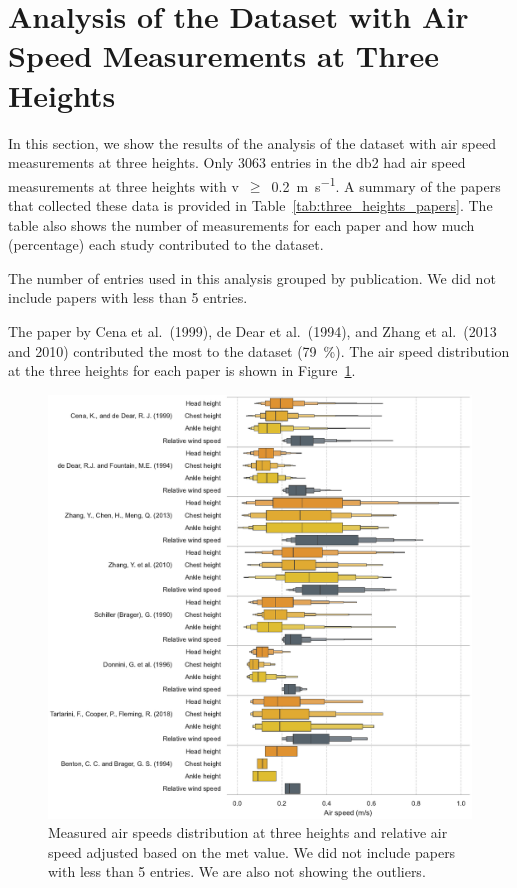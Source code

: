\appendix

\section{Analysis of the Dataset with Air Speed Measurements at Three Heights}\label{sec:analysis-of-the-dataset-with-air-speed-measurements-at-three-heights}

In this section, we show the results of the analysis of the dataset with air speed measurements at three heights.
Only \num{3063} entries in the \ac{db2} had air speed measurements at three heights with \ac{v}~$\geq$~\qty{0.2}{\m\per\s}.
A summary of the papers that collected these data is provided in Table~\ref{tab:three_heights_papers}.
The table also shows the number of measurements for each paper and how much (percentage) each study contributed to the dataset.
\begin{table}[htb!]
    \centering
    
    \caption{The number of entries used in this analysis grouped by publication.
    We did not include papers with less than \num{5} entries.}
    \label{tab:three_heights_papers}
\end{table}
The paper by Cena et al.\ (1999), de Dear et al.\ (1994), and Zhang et al.\ (2013 and 2010) contributed the most to the dataset (\qty{79}{\percent}).
The air speed distribution at the three heights for each paper is shown in Figure~\ref{fig:boxenplot_wind_speed_three_heights}.
\begin{figure}[htb!]
    \centering
    \includegraphics[width=\textwidth]{figures/boxenplot_wind_speed_three_heights}
    \caption{Measured air speeds distribution at three heights and relative air speed adjusted based on the \ac{met} value.
    We did not include papers with less than \num{5} entries.
    We are also not showing the outliers.}
    \label{fig:boxenplot_wind_speed_three_heights}
\end{figure}
